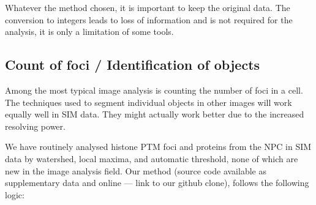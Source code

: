     Whatever the method chosen, it is important to keep the original data.
    The conversion to integers leads to loss of information and is not
    required for the analysis, it is only a limitation of some tools.

    \begin{figure}
    \end{figure}


  \subsection{Count of foci / Identification of objects}
    Among the most typical image analysis is counting the number of foci
    in a cell.  The techniques used to segment individual objects in other
    images will work equally well in SIM data.  They might actually work
    better  due to the increased resolving power.  

    We have routinely analysed histone PTM foci and proteins from the NPC
    in SIM data by watershed, local maxima, and automatic threshold, none
    of which are new in the image analysis field.  Our method (source code
    available as supplementary data and online --- link to our github clone),
    follows the following logic:

